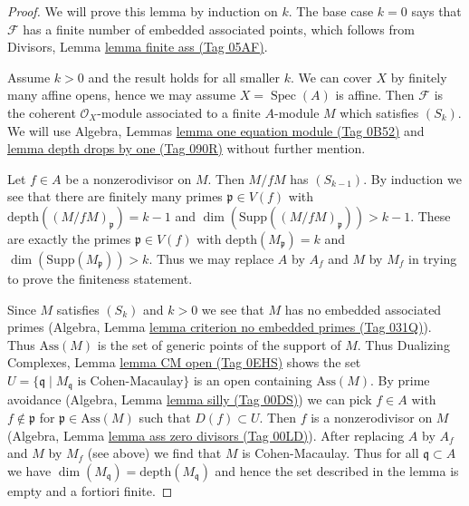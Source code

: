\documentclass{amsart}
\theoremstyle{plain}
\theoremstyle{definition}
\theoremstyle{remark}
\numberwithin{equation}{subsection}
\def\Spec{\mathop{\mathrm{Spec}}}
\begin{document}
\begin{proof}
We will prove this lemma by induction on $k$. The base case $k = 0$
says that $\mathcal{F}$ has a finite number of embedded associated points,
which follows from Divisors, Lemma \href{https://stacks.math.columbia.edu/tag/05AF}{lemma finite ass (Tag 05AF)}.

\medskip\noindent
Assume $k > 0$ and the result holds for all smaller $k$.
We can cover $X$ by finitely many affine opens, hence we may
assume $X = \Spec(A)$ is affine. Then $\mathcal{F}$ is the
coherent $\mathcal{O}_X$-module associated to a finite $A$-module $M$
which satisfies $(S_k)$. We will use
Algebra, Lemmas \href{https://stacks.math.columbia.edu/tag/0B52}{lemma one equation module (Tag 0B52)} and
\href{https://stacks.math.columbia.edu/tag/090R}{lemma depth drops by one (Tag 090R)}
without further mention.

\medskip\noindent
Let $f \in A$ be a nonzerodivisor on $M$. Then $M/fM$ has $(S_{k - 1})$.
By induction we see that there are finitely many
primes $\mathfrak p \in V(f)$ with
$\text{depth}((M/fM)_\mathfrak p) = k - 1$ and
$\dim(\text{Supp}((M/fM)_\mathfrak p)) > k - 1$.
These are exactly the primes $\mathfrak p \in V(f)$ with
$\text{depth}(M_\mathfrak p) = k$ and
$\dim(\text{Supp}(M_\mathfrak p)) > k$.
Thus we may replace $A$ by $A_f$ and $M$ by $M_f$
in trying to prove the finiteness statement.

\medskip\noindent
Since $M$ satisfies $(S_k)$ and $k > 0$ we see that $M$ has no
embedded associated primes
(Algebra, Lemma \href{https://stacks.math.columbia.edu/tag/031Q}{lemma criterion no embedded primes (Tag 031Q)}).
Thus $\text{Ass}(M)$ is the set of generic points of the support
of $M$. Thus Dualizing Complexes, Lemma \href{https://stacks.math.columbia.edu/tag/0EHS}{lemma CM open (Tag 0EHS)}
shows the set
$U = \{\mathfrak q \mid M_\mathfrak q\text{ is Cohen-Macaulay}\}$
is an open containing $\text{Ass}(M)$.
By prime avoidance (Algebra, Lemma \href{https://stacks.math.columbia.edu/tag/00DS}{lemma silly (Tag 00DS)})
we can pick $f \in A$ with
$f \not \in \mathfrak p$ for $\mathfrak p \in \text{Ass}(M)$
such that $D(f) \subset U$.
Then $f$ is a nonzerodivisor on $M$
(Algebra, Lemma \href{https://stacks.math.columbia.edu/tag/00LD}{lemma ass zero divisors (Tag 00LD)}).
After replacing $A$ by $A_f$ and $M$ by $M_f$ (see above) we
find that $M$ is Cohen-Macaulay.
Thus for all $\mathfrak q \subset A$ we have
$\dim(M_\mathfrak q) = \text{depth}(M_\mathfrak q)$
and hence the set described in the lemma is empty
and a fortiori finite.
\end{proof}
\end{document}
